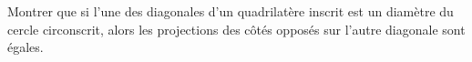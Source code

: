 Montrer que si l'une des diagonales d'un quadrilatère inscrit est un diamètre du cercle circonscrit, alors les projections des côtés opposés sur l'autre diagonale sont égales.

